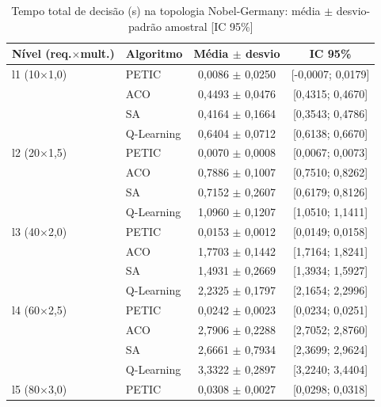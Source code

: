 \begin{table}[htb]
    \centering
    \small
    \caption{Tempo total de decisão (s) na topologia Nobel-Germany: média $\pm$ desvio-padrão amostral [IC 95\%]}
    \label{tab:tempo-nobel-germany}
    \begin{tabular}{llcc}
        \hline
        Nível (req.$\times$mult.) & Algoritmo & Média $\pm$ desvio & IC 95\% \\
        \hline
        l1 (10$\times$1,0) & PETIC & 0,0086 $\pm$ 0,0250 & [-0,0007; 0,0179] \\
         & ACO & 0,4493 $\pm$ 0,0476 & [0,4315; 0,4670] \\
         & SA & 0,4164 $\pm$ 0,1664 & [0,3543; 0,4786] \\
         & Q-Learning & 0,6404 $\pm$ 0,0712 & [0,6138; 0,6670] \\
        \hline
        l2 (20$\times$1,5) & PETIC & 0,0070 $\pm$ 0,0008 & [0,0067; 0,0073] \\
         & ACO & 0,7886 $\pm$ 0,1007 & [0,7510; 0,8262] \\
         & SA & 0,7152 $\pm$ 0,2607 & [0,6179; 0,8126] \\
         & Q-Learning & 1,0960 $\pm$ 0,1207 & [1,0510; 1,1411] \\
        \hline
        l3 (40$\times$2,0) & PETIC & 0,0153 $\pm$ 0,0012 & [0,0149; 0,0158] \\
         & ACO & 1,7703 $\pm$ 0,1442 & [1,7164; 1,8241] \\
         & SA & 1,4931 $\pm$ 0,2669 & [1,3934; 1,5927] \\
         & Q-Learning & 2,2325 $\pm$ 0,1797 & [2,1654; 2,2996] \\
        \hline
        l4 (60$\times$2,5) & PETIC & 0,0242 $\pm$ 0,0023 & [0,0234; 0,0251] \\
         & ACO & 2,7906 $\pm$ 0,2288 & [2,7052; 2,8760] \\
         & SA & 2,6661 $\pm$ 0,7934 & [2,3699; 2,9624] \\
         & Q-Learning & 3,3322 $\pm$ 0,2897 & [3,2240; 3,4404] \\
        \hline
        l5 (80$\times$3,0) & PETIC & 0,0308 $\pm$ 0,0027 & [0,0298; 0,0318] \\

\end{tabular}
\end{table}
